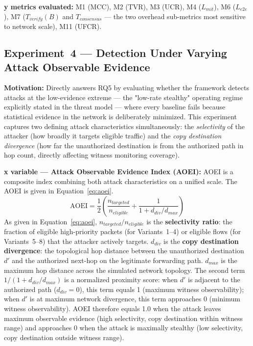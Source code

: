 \documentclass[12pt, a4paper]{report}
\begin{document}
{{\textbf{y metrics evaluated:}
M1 (MCC), M2 (TVR), M3 (UCR), M4 ($L_{mit}$),
M6 ($L_{e2e}$), M7 ($T_{verify}(B)$ and
$T_{consensus}$ — the two overhead sub-metrics
most sensitive to network scale), M11 (UFCR).



\subsection{Experiment~4 — Detection Under Varying
Attack Observable Evidence}
\label{sec:exp4}

\textbf{Motivation:} Directly answers RQ5 by
evaluating whether the framework detects attacks at
the low-evidence extreme — the "low-rate stealthy"
operating regime explicitly stated in the threat
model — where every baseline fails because
statistical evidence in the network is deliberately
minimized. This experiment captures two defining
attack characteristics simultaneously: the
\textit{selectivity} of the attacker (how broadly
it targets eligible traffic) and the
\textit{copy destination divergence} (how far the
unauthorized destination is from the authorized
path in hop count, directly affecting witness
monitoring coverage).

\textbf{x variable — Attack Observable Evidence
Index (AOEI):}
AOEI is a composite index combining both attack
characteristics on a unified scale. The AOEI is
given in Equation~\eqref{eq:aoei}.
\begin{equation}
\text{AOEI} =
\frac{1}{2}
\left(
\frac{n_{targeted}}{n_{eligible}}
+
\frac{1}{1 + d_{div}/d_{max}}
\right)
\label{eq:aoei}
\end{equation}
As given in Equation~\eqref{eq:aoei},
$n_{targeted}/n_{eligible}$ is the
\textbf{selectivity ratio}: the fraction of
eligible high-priority packets (for Variants~1--4)
or eligible flows (for Variants~5--8) that the
attacker actively targets. $d_{div}$ is the
\textbf{copy destination divergence}: the
topological hop distance between the unauthorized
destination $d'$ and the authorized next-hop on
the legitimate forwarding path. $d_{max}$ is the
maximum hop distance across the simulated network
topology. The second term $1/(1 + d_{div}/d_{max})$
is a normalized proximity score: when $d' $ is
adjacent to the authorized path ($d_{div} = 0$),
this term equals 1 (maximum witness observability);
when $d'$ is at maximum network divergence, this
term approaches 0 (minimum witness observability).
AOEI therefore equals 1.0 when the attack leaves
maximum observable evidence (high selectivity,
copy destination within witness range) and
approaches 0 when the attack is maximally
stealthy (low selectivity, copy destination
outside witness range).

}}
\end{document}
